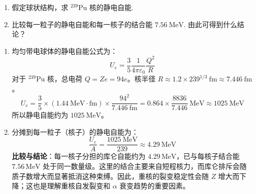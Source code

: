 \begin{exercise}\label{ex:29.8}
\begin{enumerate}
  \item[(a)] 假定球状结构，求 $^{239}\mathrm{Pu}$ 核的静电自能. 
  \item[(b)] 比较每一粒子的静电自能和每一核子的结合能 $7.56 \ \mathrm{MeV}$. 由此可得到什么结论？
\end{enumerate}
\end{exercise}
\begin{solution}
\begin{enumerate}
    \item[(a)] 均匀带电球体的静电自能公式为：
    $$ U_e = \frac{3}{5} \frac{1}{4\pi\varepsilon_0} \frac{Q^2}{R} $$
    对于 $^{239}\mathrm{Pu}$ 核，总电荷 $Q = Ze = 94e$。核半径 $R \approx 1.2 \times 239^{1/3} \ \mathrm{fm} \approx 7.446 \ \mathrm{fm}$。
    $$ U_e = \frac{3}{5} \times (1.44 \ \mathrm{MeV \cdot fm}) \times \frac{94^2}{7.446 \ \mathrm{fm}} = 0.864 \times \frac{8836}{7.446} \ \mathrm{MeV} \approx 1025 \ \mathrm{MeV} $$
    所以静电自能约为 $1025 \ \mathrm{MeV}$。

    \item[(b)] 分摊到每一粒子（核子）的静电自能为：
    $$ \frac{U_e}{A} = \frac{1025 \ \mathrm{MeV}}{239} \approx 4.29 \ \mathrm{MeV} $$
    \textbf{比较与结论}：每一核子分担的库仑自能约为 $4.29\,\mathrm{MeV}$，已与每核子结合能 $7.56\,\mathrm{MeV}$ 处于同一数量级。这里的结合主要来自短程核力，而库仑排斥会随质子数增大而显著抵消这种束缚。因此，重核的裂变稳定性会随 $Z$ 增大而下降；这也是理解重核自发裂变和 $\alpha$ 衰变趋势的重要因素。
\end{enumerate}
\end{solution}

